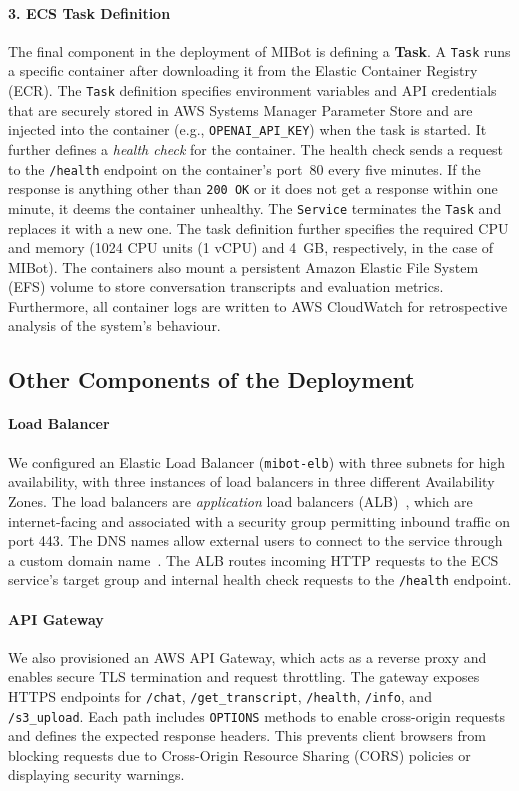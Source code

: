 \paragraph{3. ECS Task Definition} The final component in the deployment of MIBot is defining a \textbf{Task}. A \texttt{Task} runs a specific container after downloading it from the Elastic Container Registry (ECR). The \texttt{Task} definition specifies environment variables and API credentials that are securely stored in AWS Systems Manager Parameter Store and are injected into the container (e.g., \texttt{OPENAI\_API\_KEY}) when the task is started. It further defines a \emph{health check} for the container. The health check sends a request to the \texttt{/health} endpoint on the container's port~80 every five minutes. If the response is anything other than \texttt{200 OK} or it does not get a response within one minute, it deems the container unhealthy. The \texttt{Service} terminates the \texttt{Task} and replaces it with a new one. The task definition further specifies the required CPU and memory (1024 CPU units (1 vCPU) and 4~GB, respectively, in the case of MIBot). The containers also mount a persistent Amazon Elastic File System (EFS) volume to store conversation transcripts and evaluation metrics. Furthermore, all container logs are written to AWS CloudWatch for retrospective analysis of the system's behaviour.

\subsection{Other Components of the Deployment}

\paragraph{Load Balancer} We configured an Elastic Load Balancer (\texttt{mibot-elb}) with three subnets for high availability, with three instances of load balancers in three different Availability Zones. The load balancers are \emph{application} load balancers (ALB)~\citep{aws_alb}, which are internet-facing and associated with a security group permitting inbound traffic on port 443. The DNS names allow external users to connect to the service through a custom domain name~\citep{shopify_domain_seo}. The ALB routes incoming HTTP requests to the ECS service's target group and internal health check requests to the \texttt{/health} endpoint.

\paragraph{API Gateway} We also provisioned an AWS API Gateway, which acts as a reverse proxy and enables secure TLS termination and request throttling. The gateway exposes HTTPS endpoints for \texttt{/chat}, \texttt{/get\_transcript}, \texttt{/health}, \texttt{/info}, and \texttt{/s3\_upload}. Each path includes \texttt{OPTIONS} methods to enable cross-origin requests and defines the expected response headers. This prevents client browsers from blocking requests due to Cross-Origin Resource Sharing (CORS) policies or displaying security warnings.

